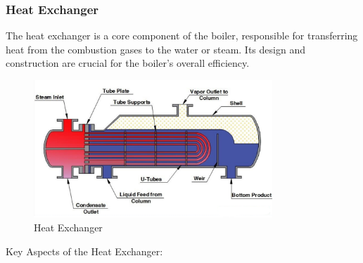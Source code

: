 \subsubsection{Heat Exchanger}
The heat exchanger is a core component of the boiler, responsible for transferring heat from the combustion gases to the water or steam. Its design and construction are crucial for the boiler's overall efficiency.
\begin{figure}[h]
\centering
\includegraphics[width=0.8\textwidth]{figs/lastmin/heat_exchanger.png}
\caption{Heat Exchanger}
\label{fig:heat_exchanger}
\end{figure}
Key Aspects of the Heat Exchanger:
